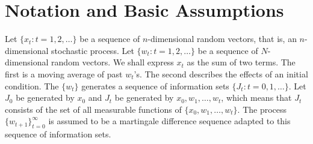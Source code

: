 %
%
%
%
%
%
%
%
%
%
%
%
%
%
%
%
%
%
%




\section
{Notation and Basic Assumptions}

Let $\{x_t : t=1,2,\ldots\}$ be a sequence of $n$-dimensional random
vectors, that is,  an $n$-dimensional stochastic process.  %
Let
$\{w_t : t=1,2,\ldots\}$ be a sequence of $N$-dimensional
random vectors.  We shall  express
$x_t$ as the sum of two terms. The first is
a moving average of past $w_t$'s. The second describes
the effects of an initial condition.  The $\{w_t\}$ generates
 a sequence of information sets $\{J_t : t=0,1,\ldots\}$.  Let
$J_0$ be generated by $x_0$ and $J_t$ be generated by $x_0, w_1, \ldots ,
w_t$, which means that $J_t$
consists of the set of all measurable functions of $\{x_0, w_1,\ldots,
w_t\}$.  The  process $\{w_{t+1}\}_{t=0}^\infty$ is
assumed to be a martingale difference sequence adapted to this sequence of
information sets.


